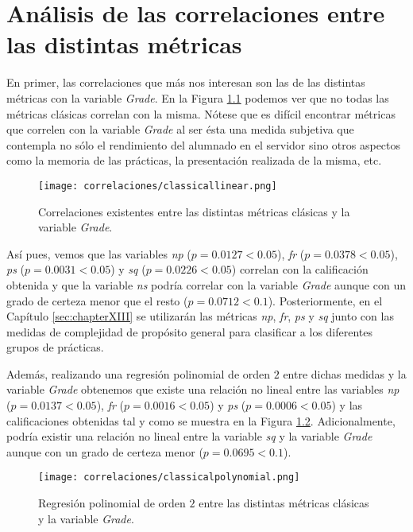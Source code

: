 \chapter{Análisis de las correlaciones entre las distintas métricas}\label{chapter:correlations}

En primer, las correlaciones que más nos interesan son las de las distintas métricas con la variable \emph{Grade}. En la Figura \ref{fig:correlations} podemos ver que no todas las métricas clásicas correlan con la misma. Nótese que es difícil encontrar métricas que correlen con la variable \emph{Grade} al ser ésta una medida subjetiva que contempla no sólo el rendimiento del alumnado en el servidor sino otros aspectos como la memoria de las prácticas, la presentación realizada de la misma, etc.

\begin{figure}[H]
    \centering
    \texttt{[image: correlaciones/classicallinear.png]}
    \caption{Correlaciones existentes entre las distintas métricas clásicas y la variable \emph{Grade}.}
    \label{fig:correlations}
\end{figure}

Así pues, vemos que las variables \emph{np} ($p = 0.0127 < 0.05$), \emph{fr} ($p = 0.0378 < 0.05$), \emph{ps} ($p = 0.0031 < 0.05$) y \emph{sq} ($p = 0.0226 < 0.05$) correlan con la calificación obtenida y que la variable \emph{ns} podría correlar con la variable \emph{Grade} aunque con un grado de certeza menor que el resto ($p = 0.0712 < 0.1$). Posteriormente, en el Capítulo \ref{sec:chapterXIII} se utilizarán las métricas \emph{np}, \emph{fr}, \emph{ps} y \emph{sq} junto con las medidas de complejidad de propósito general para clasificar a los diferentes grupos de prácticas.

Además, realizando una regresión polinomial de orden $2$ entre dichas medidas y la variable \emph{Grade} obtenemos que existe una relación no lineal entre las variables \emph{np} ($p = 0.0137 < 0.05$), \emph{fr} ($p = 0.0016 < 0.05$) y \emph{ps} ($p = 0.0006 < 0.05$) y las calificaciones obtenidas tal y como se muestra en la Figura \ref{fig:correlations2}. Adicionalmente, podría existir una relación no lineal entre la variable \emph{sq} y la variable \emph{Grade} aunque con un grado de certeza menor ($p = 0.0695 < 0.1$).

\begin{figure}[H]
    \centering
    \texttt{[image: correlaciones/classicalpolynomial.png]}
    \caption{Regresión polinomial de orden $2$ entre las distintas métricas clásicas y la variable \emph{Grade}.}
    \label{fig:correlations2}
\end{figure}

